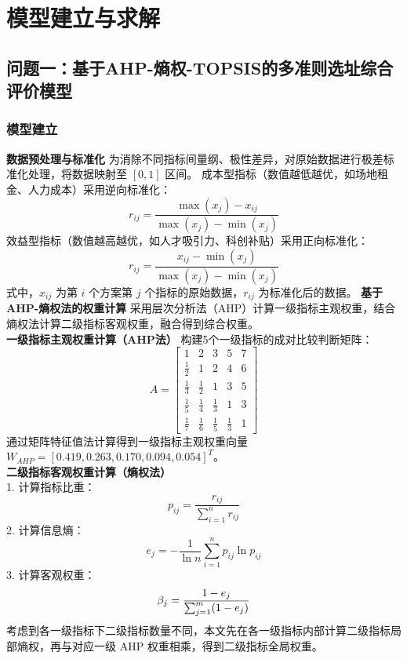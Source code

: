 \documentclass[12pt,a4paper]{article}
\begin{document}
\section{模型建立与求解}
\subsection{问题一：基于AHP-熵权-TOPSIS的多准则选址综合评价模型}
\subsubsection{模型建立}
\textbf{数据预处理与标准化}
为消除不同指标间量纲、极性差异，对原始数据进行极差标准化处理，将数据映射至 $[0,1]$ 区间。
成本型指标（数值越低越优，如场地租金、人力成本）采用逆向标准化：
\begin{equation}
r_{ij} = \frac{\max(x_j) - x_{ij}}{\max(x_j) - \min(x_j)}
\end{equation}
效益型指标（数值越高越优，如人才吸引力、科创补贴）采用正向标准化：
\begin{equation}
r_{ij} = \frac{x_{ij} - \min(x_j)}{\max(x_j) - \min(x_j)}
\end{equation}
式中，$x_{ij}$ 为第 $i$ 个方案第 $j$ 个指标的原始数据，$r_{ij}$ 为标准化后的数据。
\textbf{基于AHP-熵权法的权重计算}
采用层次分析法（AHP）计算一级指标主观权重，结合熵权法计算二级指标客观权重，融合得到综合权重。\\
\vspace{1em}\textbf{一级指标主观权重计算（AHP法）}
构建5个一级指标的成对比较判断矩阵：
\begin{equation}
A=
\begin{bmatrix}
1 & 2 & 3 & 5 & 7 \\
\frac{1}{2} & 1 & 2 & 4 & 6 \\
\frac{1}{3} & \frac{1}{2} & 1 & 3 & 5 \\
\frac{1}{5} & \frac{1}{4} & \frac{1}{3} & 1 & 3 \\
\frac{1}{7} & \frac{1}{6} & \frac{1}{5} & \frac{1}{3} & 1
\end{bmatrix}
\end{equation}
通过矩阵特征值法计算得到一级指标主观权重向量 $W_{AHP} = [0.419, 0.263, 0.170, 0.094, 0.054]^T$。\\
\vspace{1em}\textbf{二级指标客观权重计算（熵权法）}\\

\noindent 
\vspace{1em}1.  计算指标比重：    
\begin{equation}    
p_{ij} = \frac{r_{ij}}{\sum_{i=1}^{n} r_{ij}}    
\end{equation}
2.  计算信息熵：    
\begin{equation}    
e_j = -\frac{1}{\ln n} \sum_{i=1}^{n} p_{ij} \ln p_{ij}    
\end{equation}
3.  计算客观权重：    
\begin{equation}    
\beta_j = \frac{1 - e_j}{\sum_{j=1}^{m} (1 - e_j)}    
\vspace{1em}\end{equation}
考虑到各一级指标下二级指标数量不同，本文先在各一级指标内部计算二级指标局部熵权，再与对应一级 AHP 权重相乘，得到二级指标全局权重。
\end{document}
